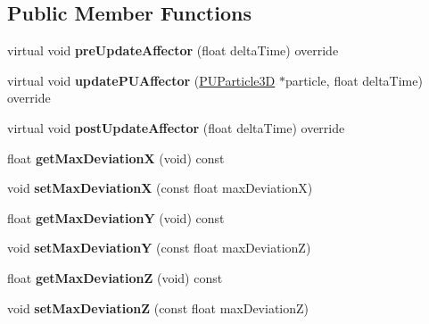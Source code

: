 \subsection*{Public Member Functions}
\begin{DoxyCompactItemize}
\item 
\mbox{\label{classPURandomiser_ae88fa2dcbc980b5cd6b45041c77ed22b}} 
virtual void {\bfseries pre\+Update\+Affector} (float delta\+Time) override
\item 
\mbox{\label{classPURandomiser_a26d66c2f900b357aac9bc77c72c7b410}} 
virtual void {\bfseries update\+P\+U\+Affector} (\hyperlink{structPUParticle3D}{P\+U\+Particle3D} $\ast$particle, float delta\+Time) override
\item 
\mbox{\label{classPURandomiser_a21c204940d20436daf7fdae18dc9f6e1}} 
virtual void {\bfseries post\+Update\+Affector} (float delta\+Time) override
\item 
\mbox{\label{classPURandomiser_a2dccc246da4fcc85f8a005a178461ce0}} 
float {\bfseries get\+Max\+DeviationX} (void) const
\item 
\mbox{\label{classPURandomiser_a100768cb547e6ad92c45e8c021c97fd9}} 
void {\bfseries set\+Max\+DeviationX} (const float max\+DeviationX)
\item 
\mbox{\label{classPURandomiser_a49ab41c165a40c79e58c5cbefa869453}} 
float {\bfseries get\+Max\+DeviationY} (void) const
\item 
\mbox{\label{classPURandomiser_a3c6822afc69ec2dae5d51f5c739c8dbc}} 
void {\bfseries set\+Max\+DeviationY} (const float max\+DeviationZ)
\item 
\mbox{\label{classPURandomiser_ae8fe05d05003e5f7c450b1d4c4729363}} 
float {\bfseries get\+Max\+DeviationZ} (void) const
\item 
\mbox{\label{classPURandomiser_ab1218d12b856951e80b0794fde36d47d}} 
void {\bfseries set\+Max\+DeviationZ} (const float max\+DeviationZ)
\item 
\mbox{\label{classPURandomiser_a9d153e16caba7a563152fd2fbdfbde4e}} 

\end{DoxyCompactItemize}
